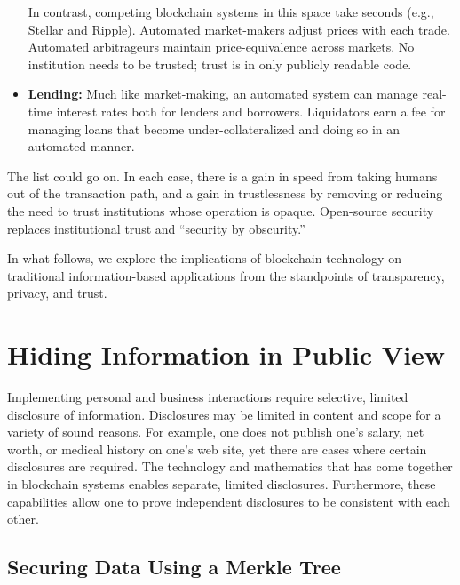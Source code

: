\documentclass[11pt,dvipdfm]{article}
\begin{document}
\begin{itemize}
In contrast, competing blockchain systems in this space take seconds (e.g., Stellar\cite{StellarSOSP19} and Ripple).
Automated market-makers  adjust prices with each trade.
Automated arbitrageurs maintain price-equivalence across markets.
No institution needs to be trusted; trust is in only publicly readable code.
\item {\bf Lending:}  Much like market-making, an automated system can manage real-time interest
rates both for lenders and borrowers.  Liquidators earn a fee for managing loans that become
under-collateralized and doing so in an automated manner.  
\end{itemize}
The list could go on. 
In each case, there is a gain in speed from taking humans out of the transaction path, and a gain in trustlessness
by removing or reducing the need to trust institutions whose operation is opaque.
Open-source security replaces institutional trust and ``security by obscurity.''

In what follows, we explore the implications of blockchain technology on traditional information-based applications
from the standpoints of transparency, privacy, and trust.

\section{Hiding Information in Public View}
\label{hfk:hiding}

Implementing personal and business interactions require selective, limited disclosure of information.
Disclosures may be limited in content and scope for a variety of sound reasons.
For example, one does not publish one's salary, net worth, or medical history on one's web site, yet there are cases where
certain disclosures are required. 
The technology and mathematics that has come together in blockchain systems  enables  separate, limited
disclosures.
Furthermore, these capabilities  allow one to prove independent disclosures to be consistent with each other.

\subsection{Securing Data Using a Merkle Tree}
\end{document}
